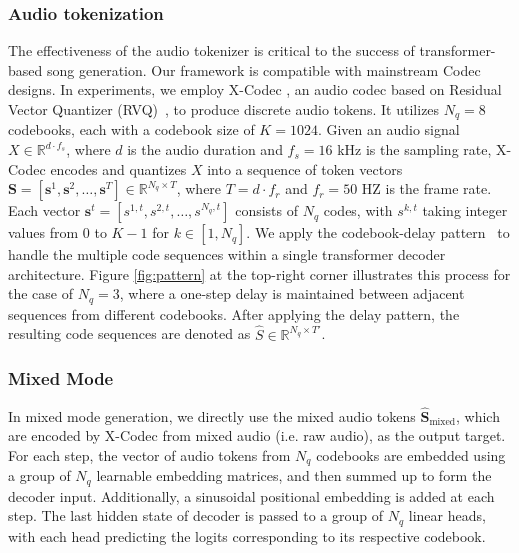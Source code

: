 \subsubsection{Audio tokenization}
The effectiveness of the audio tokenizer is critical to the success of transformer-based song generation.
Our framework is compatible with mainstream Codec designs.
In experiments, we employ X-Codec \cite{ye2024xcodec}, an audio codec based on Residual Vector Quantizer (RVQ)~\cite{zeghidour2021soundstream}, to produce discrete audio tokens.
It utilizes $N_{q}=8$ codebooks, each with a codebook size of $K=1024$. Given an audio signal $X \in \mathbb{R}^{d \cdot f_s}$, where $d$ is the audio duration and $f_s = 16$ kHz is the sampling rate, X-Codec encodes and quantizes $X$ into a sequence of token vectors $\mathbf{S} = [\mathbf{s}^1, \mathbf{s}^2, \dots, \mathbf{s}^T] \in \mathbb{R}^{N_q \times T}$, where $T= d\cdot f_r$ and $f_r=50$ HZ is the frame rate. Each vector $\mathbf{s}^t = [s^{1,t}, s^{2,t}, \dots, s^{N_q, t}]$ consists of $N_q$ codes, with $s^{k,t}$ taking integer values from 0 to $K-1$ for $k \in [1, N_q]$. 
We apply the codebook-delay pattern~\cite{copet2024musicgen} to handle the multiple code sequences within a single transformer decoder architecture. Figure \ref{fig:pattern} at the top-right corner illustrates this process for the case of $N_q = 3$, where a one-step delay is maintained between adjacent sequences from different codebooks. After applying the delay pattern, the resulting code sequences are denoted as $\hat{S}  \in \mathbb{R}^{N_q \times T'}$. 


\subsubsection{Mixed Mode}
In mixed mode generation, we directly use the mixed audio tokens $\hat{\mathbf{S}}_{\text{mixed}}$, which are encoded by X-Codec from mixed audio (i.e. raw audio), as the output target.
For each step, the vector of audio tokens 
from $N_q$ codebooks are embedded using a group of $N_q$ learnable embedding matrices, and then summed up to form the decoder input. Additionally, a sinusoidal positional embedding is added at each step.
The last hidden state of decoder is passed to a group of $N_q$ linear heads, with each head predicting the logits corresponding to its respective codebook.

